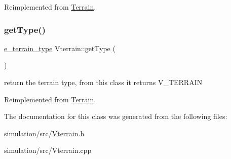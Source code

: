 Reimplemented from \mbox{\hyperlink{class_terrain_a10fcf414cba83e769d99156fe16aa795}{Terrain}}.

\mbox{\label{class_vterrain_abf5de57e84f4aac4f7cdb5c4f3e37b6a}} 
\subsubsection{\texorpdfstring{get\+Type()}{getType()}}
{\footnotesize\ttfamily \mbox{\hyperlink{_terrain_8h_a6d0b7e83bb7325270c1162bece970fd8}{e\+\_\+terrain\+\_\+type}} Vterrain\+::get\+Type (\begin{DoxyParamCaption}{ }\end{DoxyParamCaption})\hspace{0.3cm}{\ttfamily [virtual]}}

return the terrain type, from this class it returns V\+\_\+\+T\+E\+R\+R\+A\+IN 

Reimplemented from \mbox{\hyperlink{class_terrain_a6cd1220b8e64466cc7a2219efff4141b}{Terrain}}.



The documentation for this class was generated from the following files\+:\begin{DoxyCompactItemize}
\item 
simulation/src/\mbox{\hyperlink{_vterrain_8h}{Vterrain.\+h}}\item 
simulation/src/Vterrain.\+cpp\end{DoxyCompactItemize}
